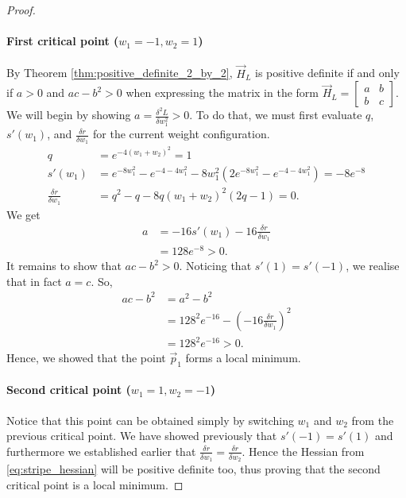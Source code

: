 \begin{proof}
    \paragraph{First critical point ($w_1=-1, w_2=1$)}
    By Theorem \ref{thm:positive_definite_2_by_2}, $\vec{H}_L$ is positive definite if and only if $a>0$ and $ac-b^2>0$ when expressing the matrix in the form
    $\vec{H}_L = \begin{bmatrix}
        a & b \\ b & c
    \end{bmatrix}$.
    We will begin by showing $a = \frac{\delta ^2 L}{\delta w_1^2}>0$.
    To do that, we must first evaluate $q$,$s'(w_1)$, and $\frac{\delta r}{\delta w_1}$ for the current weight configuration.
    \begin{align*}
        q &= e^{-4(w_1+w_2)^2} = 1 \\
        s'(w_1) &= e^{-8 w_1^2} - e^{-4 -4w_1^2} - 8 w_1^2 \left(2 e^{-8 w_1^2} - e^{-4-4 w_1^2}\right) = -8e^{-8} \\
        \frac{\delta r}{\delta w_1} &= q^2 - q - 8q(w_1 + w_2)^2 (2q - 1) = 0.
    \end{align*}
    We get
    \begin{align*}
        a &= -16s'(w_1) - 16 \frac{\delta r}{\delta w_1} \\
        &= 128 e^{-8} > 0.
    \end{align*}
    It remains to show that $ac - b^2 > 0$. 
    Noticing that $s'(1) = s'(-1)$, we realise that in fact $a=c$.
    So,
    \begin{align*}
        ac - b^2
        &= a^2 - b^2 \\
        &= 128^2e^{-16} - \left(-16 \frac{\delta r}{\delta w_1}\right)^2 \\
        &= 128^2e^{-16} > 0.
    \end{align*}
    Hence, we showed that the point $\vec{p}_1$ forms a local minimum.

    \paragraph{Second critical point ($w_1=1, w_2=-1$)}
    Notice that this point can be obtained simply by switching $w_1$ and $w_2$ from the previous critical point.
    We have showed previously that $s'(-1)=s'(1)$ and furthermore we established earlier that $\frac{\delta r}{\delta w_1} =\frac{\delta r}{\delta w_2}$.
    Hence the Hessian from \ref{eq:stripe_hessian} will be positive definite too, thus proving that the second critical point is a local minimum.


\end{proof}
